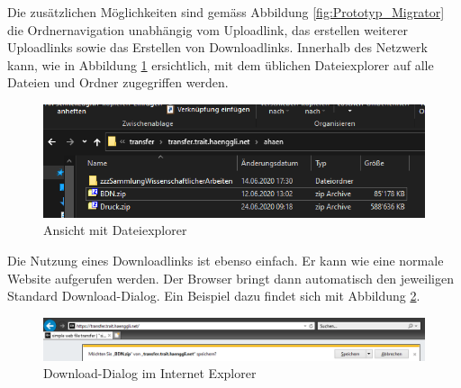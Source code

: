 Die zusätzlichen Möglichkeiten sind gemäss Abbildung \ref{fig:Prototyp_Migrator} 
die Ordnernavigation unabhängig vom Uploadlink, das erstellen weiterer Uploadlinks 
sowie das Erstellen von Downloadlinks.
Innerhalb des Netzwerk kann, wie in Abbildung \ref{fig:file_explorer} ersichtlich, mit dem üblichen Dateiexplorer auf alle Dateien und Ordner zugegriffen werden.

\begin{figure}[!h]
    \centering
    \includegraphics[width=1\linewidth]{content/images/file_explorer.png}
    \caption{Ansicht mit Dateiexplorer}
    \label{fig:file_explorer}
\end{figure}

Die Nutzung eines Downloadlinks ist ebenso einfach. Er kann wie eine normale Website aufgerufen werden.
Der Browser bringt dann automatisch den jeweiligen Standard Download-Dialog. 
Ein Beispiel dazu findet sich mit Abbildung \ref{fig:ie_download}.
\begin{figure}[!h]
    \centering
    \includegraphics[width=1\linewidth]{content/images/prototyp_download.png}
    \caption{Download-Dialog im Internet Explorer}
    \label{fig:ie_download}
\end{figure}

